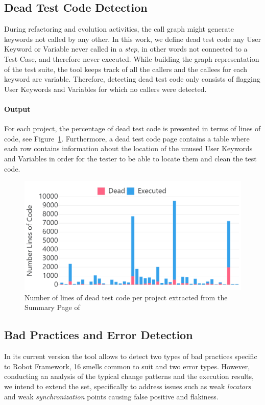 \subsection{Dead Test Code Detection}

During refactoring and evolution activities, the call graph might generate keywords not called by any other. In this work, we define dead test code any User Keyword or Variable never called in a \emph{step}, in other words not connected to a Test Case, and therefore never executed. While building the graph representation of the test suite, the tool keeps track of all the callers and the callees for each keyword are variable. Therefore, detecting dead test code only consists of flagging User Keywords and Variables for which no callers were detected. 

\paragraph{Output} For each project, the percentage of dead test code is presented in terms of lines of code, see Figure~\ref{fig:dead-code}. Furthermore, a dead test code page contains a table where each row contains information about the location of the unused User Keywords and Variables in order for the tester to be able to locate them and clean the test code.

\begin{figure}[t!]
\centering
\includegraphics[width=0.75\columnwidth]{figures/ikora/dead-code.png}
\caption{Number of lines of dead test code per project extracted from the Summary Page of \tool}
\label{fig:dead-code}
\end{figure}

\subsection{Bad Practices and Error Detection}

In its current version the tool allows to detect two types of bad practices specific to Robot Framework, 16 smells common to \gls{suit} and two error types. However, conducting an analysis of the typical change patterns and the execution results, we intend to extend the set, specifically to address issues such as weak \emph{locators} and weak \emph{synchronization} points causing false positive and flakiness.

